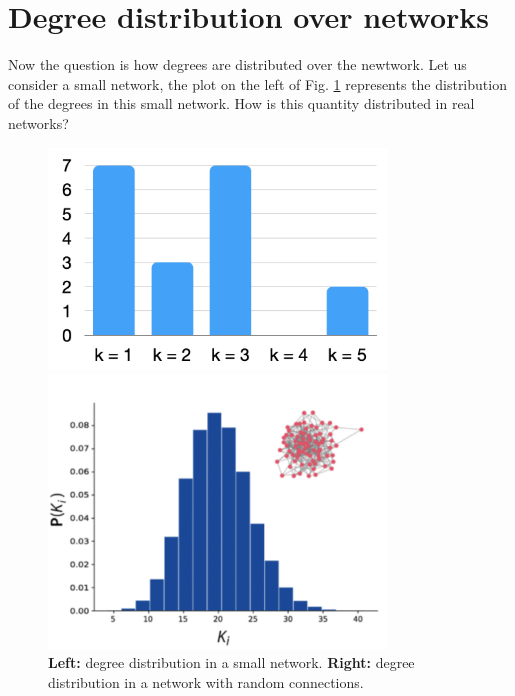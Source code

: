 \documentclass[../main/main.tex]{subfiles}
\begin{document}
\section{Degree distribution over networks}
Now the question is how degrees are distributed over the newtwork. Let us consider a small network, the plot on the left of Fig. \ref{fig:06_2} represents the distribution of the degrees in this small network. How is this quantity distributed in real networks?

\begin{figure}[h!]
\begin{minipage}[c]{0.5\linewidth}
\centering
\includegraphics[width=0.8\textwidth]{../lessons/image/06/2.png}
\end{minipage}
\begin{minipage}[]{0.5\linewidth}
\centering
\includegraphics[width=0.8\textwidth]{../lessons/image/06/3.png}
\end{minipage}
\caption{\label{fig:06_2} \textbf{Left:} degree distribution in a small network. \textbf{Right:} degree distribution in a network with random connections. }
\end{figure}
\end{document}
